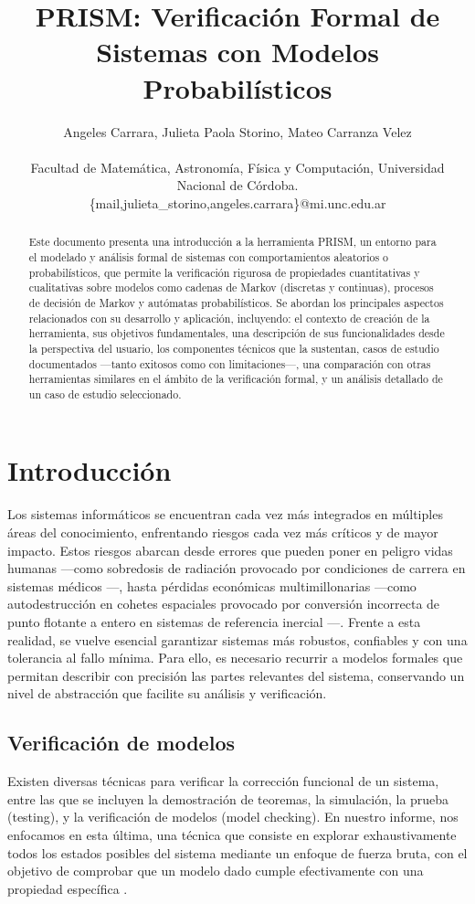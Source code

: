 \documentclass{article}
\title{\textbf{PRISM: Verificación Formal de Sistemas con Modelos Probabilísticos}}
\author{Angeles Carrara, Julieta Paola Storino, Mateo Carranza Velez\\ \\
\small{Facultad de Matemática, Astronomía, Física y Computación, Universidad Nacional de Córdoba.}\\
\small{\{mail,julieta\_storino,angeles.carrara\}@mi.unc.edu.ar}\\
}
\date{}
\begin{document}
\maketitle
\begin{abstract}
Este documento presenta una introducción a la herramienta PRISM\cite{KNP11}, un entorno para el modelado y análisis formal de sistemas con comportamientos aleatorios o probabilísticos, que permite la verificación rigurosa de propiedades cuantitativas y cualitativas sobre modelos como cadenas de Markov (discretas y continuas), procesos de decisión de Markov y autómatas probabilísticos. Se abordan los principales aspectos relacionados con su desarrollo y aplicación, incluyendo: el contexto de creación de la herramienta, sus objetivos fundamentales, una descripción de sus funcionalidades desde la perspectiva del usuario, los componentes técnicos que la sustentan, casos de estudio documentados —tanto exitosos como con limitaciones—, una comparación con otras herramientas similares en el ámbito de la verificación formal, y un análisis detallado de un caso de estudio seleccionado.
\end{abstract}

\section{Introducción}

Los sistemas informáticos se encuentran cada vez más integrados en múltiples áreas del conocimiento, enfrentando riesgos cada vez más críticos y de mayor impacto. Estos riesgos abarcan desde errores que pueden poner en peligro vidas humanas —como sobredosis de radiación provocado por condiciones de carrera en sistemas médicos \cite{LT93}—, hasta pérdidas económicas multimillonarias —como autodestrucción en cohetes espaciales provocado por conversión incorrecta de punto flotante a entero en sistemas de referencia inercial \cite{Lan96}—. Frente a esta realidad, se vuelve esencial garantizar sistemas más robustos, confiables y con una tolerancia al fallo mínima. Para ello, es necesario recurrir a modelos formales que permitan describir con precisión las partes relevantes del sistema, conservando un nivel de abstracción que facilite su análisis y verificación.

\subsection{Verificación de modelos}

Existen diversas técnicas para verificar la corrección funcional de un sistema, entre las que se incluyen la demostración de teoremas, la simulación, la prueba (testing), y la verificación de modelos (model checking). En nuestro informe, nos enfocamos en esta última, una técnica que consiste en explorar exhaustivamente todos los estados posibles del sistema mediante un enfoque de fuerza bruta, con el objetivo de comprobar que un modelo dado cumple efectivamente con una propiedad específica \cite{BK07}.
\end{document}
